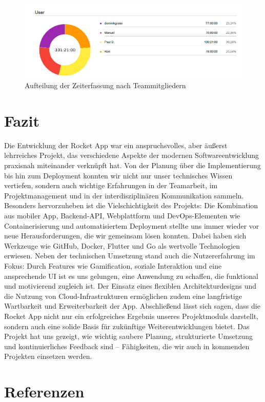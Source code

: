 \documentclass[11pt,a4paper]{article}
\begin{document}
\begin{figure}[H]
    \centering
    \includegraphics[width=\textwidth]{images/clockify_piechart.png}
    \caption{Aufteilung der Zeiterfassung nach Teammitgliedern}
    \label{fig:piechart}
\end{figure}
\newpage
\section{Fazit}
Die Entwicklung der Rocket App war ein anspruchsvolles, aber äußerst lehrreiches Projekt, das verschiedene Aspekte der modernen Softwareentwicklung praxisnah miteinander verknüpft hat.
Von der Planung über die Implementierung bis hin zum Deployment konnten wir nicht nur unser technisches Wissen vertiefen, sondern auch wichtige Erfahrungen in der Teamarbeit,
im Projektmanagement und in der interdisziplinären Kommunikation sammeln.
Besonders hervorzuheben ist die Vielschichtigkeit des Projekts: Die Kombination aus mobiler App, Backend-API, Webplattform und DevOps-Elementen wie Containerisierung und automatisiertem Deployment
stellte uns immer wieder vor neue Herausforderungen, die wir gemeinsam lösen konnten. Dabei haben sich Werkzeuge wie GitHub, Docker, Flutter und Go als wertvolle Technologien erwiesen.
Neben der technischen Umsetzung stand auch die Nutzererfahrung im Fokus: Durch Features wie Gamification, soziale Interaktion und eine ansprechende UI ist es uns gelungen, eine Anwendung zu schaffen,
die funktional und motivierend zugleich ist. Der Einsatz eines flexiblen Architekturdesigns und die Nutzung von Cloud-Infrastrukturen ermöglichen zudem eine langfristige Wartbarkeit und Erweiterbarkeit der App.
Abschließend lässt sich sagen, dass die Rocket App nicht nur ein erfolgreiches Ergebnis unseres Projektmoduls darstellt, sondern auch eine solide Basis für zukünftige Weiterentwicklungen bietet.
Das Projekt hat uns gezeigt, wie wichtig saubere Planung, strukturierte Umsetzung und kontinuierliches Feedback sind – Fähigkeiten, die wir auch in kommenden Projekten einsetzen werden.
\newpage
\section{Referenzen}
\end{document}
